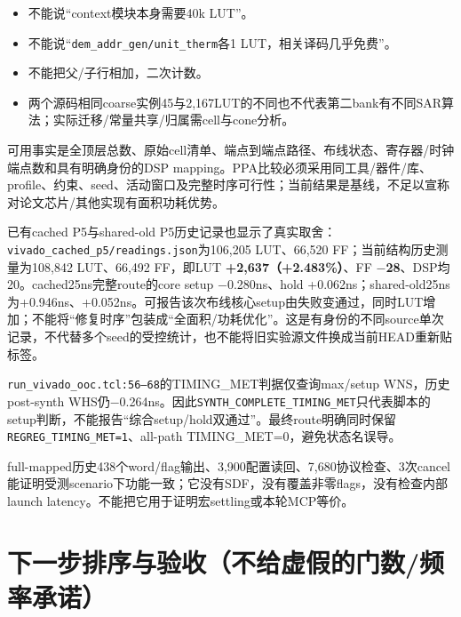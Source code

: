 \documentclass[UTF8,fontset=fandol,10pt,a4paper,openany]{ctexrep}
\newcommand{\code}[1]{\nolinkurl{#1}}
\begin{document}
\begin{itemize}
\item 不能说“context模块本身需要40k LUT”。
\item 不能说“\code{dem_addr_gen/unit_therm}各1 LUT，相关译码几乎免费”。
\item 不能把父/子行相加，二次计数。
\item 两个源码相同coarse实例45与2,167LUT的不同也不代表第二bank有不同SAR算法；实际迁移/常量共享/归属需cell与cone分析。
\end{itemize}


可用事实是全顶层总数、原始cell清单、端点到端点路径、布线状态、寄存器/时钟端点数和具有明确身份的DSP mapping。PPA比较必须采用同工具/器件/库、profile、约束、seed、活动窗口及完整时序可行性；当前结果是基线，不足以宣称对论文芯片/其他实现有面积功耗优势。


已有cached P5与shared-old P5历史记录也显示了真实取舍：\code{vivado_cached_p5/readings.json}为106,205 LUT、66,520 FF；当前结构历史测量为108,842 LUT、66,492 FF，即LUT \textbf{+2,637（+2.483\%）}、FF \textbf{\ensuremath{-}28}、DSP均20。cached25ns完整route的core setup \ensuremath{-}0.280ns、hold +0.062ns；shared-old25ns为+0.946ns、+0.052ns。可报告该次布线核心setup由失败变通过，同时LUT增加；不能将“修复时序”包装成“全面积/功耗优化”。这是有身份的不同source单次记录，不代替多个seed的受控统计，也不能将旧实验源文件换成当前HEAD重新贴标签。


\code{run_vivado_ooc.tcl:56–68}的TIMING\_MET判据仅查询max/setup WNS，历史post-synth WHS仍\ensuremath{-}0.264ns。因此\code{SYNTH_COMPLETE_TIMING_MET}只代表脚本的setup判断，不能报告“综合setup/hold双通过”。最终route明确同时保留\code{REGREG_TIMING_MET=1}、all-path TIMING\_MET=0，避免状态名误导。


full-mapped历史438个word/flag输出、3,900配置读回、7,680协议检查、3次cancel能证明受测scenario下功能一致；它没有SDF，没有覆盖非零flags，没有检查内部launch latency。不能把它用于证明宏settling或本轮MCP等价。


\section{下一步排序与验收（不给虚假的门数/频率承诺）}
\end{document}
